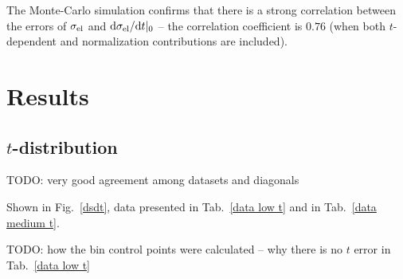 \documentclass[doublecol]{../macros/epl2}
\def\d{{\rm d}}
\begin{document}
The Monte-Carlo simulation confirms that there is a strong correlation between the errors of $\sigma_{\rm el}$ and $\d\sigma_{\rm el}/\d t|_0$ -- the correlation coefficient is $0.76$ (when both $t$-dependent and normalization contributions are included).



\section{Results}

\subsection{$t$-distribution}

TODO: very good agreement among datasets and diagonals

Shown in Fig.~\ref{dsdt}, data presented in Tab.~\ref{data low t} and in Tab.~\ref{data medium t}.

TODO: how the bin control points were calculated -- why there is no $t$ error in Tab.~\ref{data low t}

\end{document}
